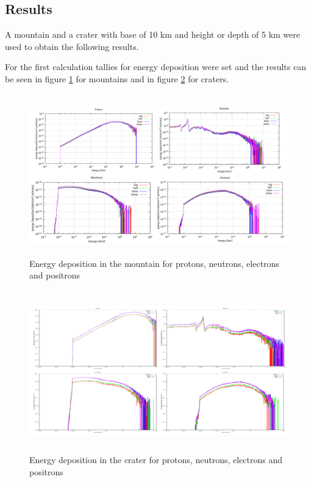 \subsection*{Results}
A mountain and a crater with base of 10 km and height or depth of 5 km were used to 
obtain the following results. 

For the first calculation tallies for energy deposition were set and the results can be seen 
in figure \ref{energy_mountain} for mountains and in figure \ref{energy_crater} 
for craters. 

\begin{figure}
 \begin{centering}
 \centering
 \includegraphics[width=0.6\linewidth,height=7cm]{../figs/energy_deposition_mountain.png}
 \caption{Energy deposition in the mountain for protons, neutrons, electrons and positrons}
 \label{energy_mountain}
 \end{centering}
\end{figure}

\begin{figure}
 \begin{centering}
 \centering
 \includegraphics[width=0.6\linewidth,height=7cm]{../figs/deposition_crater.png}
 \caption{Energy deposition in the crater for protons, neutrons, electrons and positrons}
 \label{energy_crater}
 \end{centering}
\end{figure}

